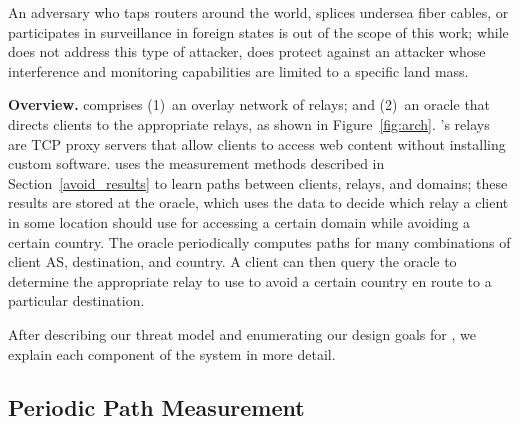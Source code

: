 An adversary who taps routers around the world, splices undersea fiber cables, or participates in 
surveillance in foreign states is out of the scope of this work; while \system{} does not address this 
type of attacker, \system{} does protect against an attacker whose interference and monitoring 
capabilities are limited to a specific land mass.



{\bf Overview.} \system{} comprises (1)~an overlay network of relays; and (2)~an oracle that
directs clients to the appropriate relays, as shown in Figure~\ref{fig:arch}.
\system{}'s relays are TCP proxy servers that allow clients to access web
content without installing custom software. \system{} uses the measurement
methods described in Section~\ref{avoid_results} to learn paths between
clients, relays, and domains; these results are stored at the oracle, which
uses the data to decide which relay a client in some location should use for
accessing a certain domain while avoiding a certain country.  The oracle
periodically computes paths for many combinations of client AS, destination,
and country.   A client can then query the oracle to determine the appropriate
relay to use to avoid a certain country en route to a particular destination.

After describing our threat model and enumerating our design goals for \system{}, we explain each component of
the system in more detail. 



\subsection{Periodic Path Measurement}

